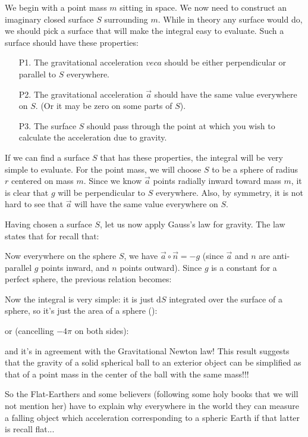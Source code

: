 	We begin with a point mass $m$ sitting in space. We now need to construct an imaginary closed surface $S$ surrounding $m$. While in theory any surface would do, we should pick a surface that will make the integral easy to evaluate. Such a surface should have these properties:
	\begin{enumerate}
		\item[P1.] The gravitational acceleration $vec{a}$ should be either perpendicular or parallel to $S$ everywhere.

		\item[P2.] The gravitational acceleration $\vec{a}$ should have the same value everywhere on $S$. (Or it may be zero on some parts of $S$).

		\item[P3.] The surface $S$ should pass through the point at which you wish to calculate the acceleration due to gravity.
	\end{enumerate}
	If we can find a surface $S$ that has these properties, the integral will be very simple to evaluate. For the point mass, we will choose $S$ to be a sphere of radius $r$ centered on mass $m$. Since we know $\vec{a}$ points radially inward toward mass $m$, it is clear that $g$ will be perpendicular to $S$ everywhere. Also, by symmetry, it is not hard to see that $\vec{a}$ will have the same value everywhere on $S$. 

	Having chosen a surface $S$, let us now apply Gauss’s law for gravity. The law states that for recall that:
	
	Now everywhere on the sphere $S$, we have $\vec{a}\circ\vec{n}=-g$ (since $\vec{a}$ and $n$ are anti-parallel $g$ points inward, and $n$ points outward). Since $g$ is a constant for a perfect sphere, the previous relation becomes:
	
	Now the integral is very simple: it is just $\mathrm{d}S$ integrated over the surface of a sphere, so it's just the area of a sphere ():
	
	or (cancelling $-4\pi$ on both sides):
	
	and it's in agreement with the Gravitational Newton law! This result suggests that the gravity of a solid spherical ball to an exterior object can be simplified as that of a point mass in the center of the ball with the same mass!!!
	
	So the Flat-Earthers and some believers (following some holy books that we will not mention her) have to explain why everywhere in the world they can measure a falling object which acceleration corresponding to a spheric Earth if that latter is recall flat...

